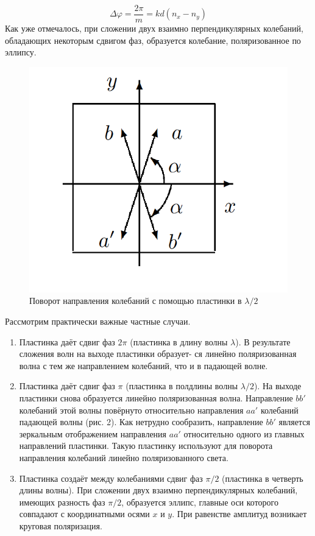 \documentclass[a4paper, 12pt]{article}%
\begin{document}
	\begin{equation}\label{}
		\Delta \varphi =  \dfrac{2\pi}{m} = k d(n_x - n_y)
	\end{equation}
	Как уже отмечалось, при сложении двух взаимно перпендикулярных колебаний, обладающих некоторым сдвигом фаз, образуется колебание, поляризованное по эллипсу.
	
	\begin{figure}
		\includegraphics[width=\linewidth]{2}
		\caption{Поворот направления колебаний с помощью пластинки в $ \lambda / 2 $}
		\label{ris 2}
	\end{figure}
	
	
	Рассмотрим практически важные частные случаи.
	
	\begin{enumerate}
		
		\item Пластинка даёт сдвиг фаз $ 2\pi $ (пластинка в длину волны $ \lambda $). В результате сложения волн на выходе пластинки образует-
		ся линейно поляризованная волна с тем же направлением колебаний, что и в падающей волне.
		
		\item Пластинка даёт сдвиг фаз $ \pi $ (пластинка в полдлины волны $ \lambda / 2 $). На выходе пластинки снова образуется линейно поляризованная волна. Направление $ bb' $ колебаний этой волны повёрнуто относительно направления $ aa' $ колебаний падающей волны (рис. 2). Как нетрудно сообразить, направление $ bb' $ является зеркальным отображением направления $ aa' $ относительно одного из главных направлений пластинки. Такую пластинку используют для поворота направления колебаний линейно поляризованного света.
		
		\item Пластинка создаёт между колебаниями сдвиг фаз $ \pi/2 $ (пластинка
		в четверть длины волны). При сложении двух взаимно перпендикулярных колебаний, имеющих разность фаз $ \pi/2 $, образуется эллипс, главные оси которого совпадают с координатными осями $ x $ и $ y $. При равенстве амплитуд возникает круговая поляризация.
		
	\end{enumerate}
	
\end{document}
